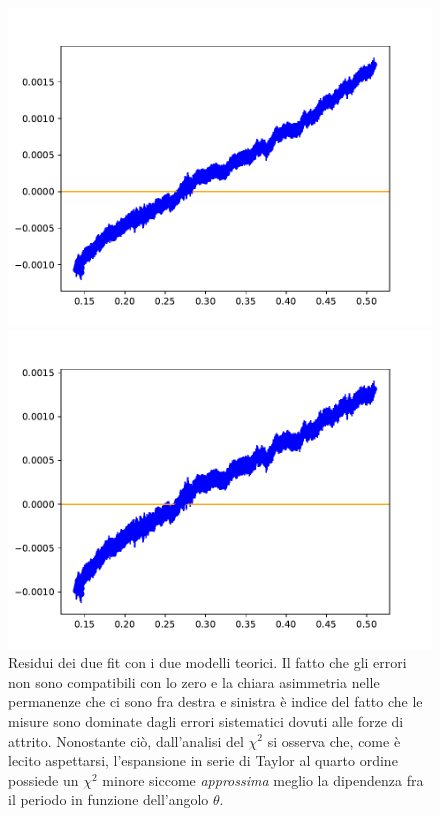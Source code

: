 \documentclass{article}
\begin{document}
\begin{figure}[H]
\hspace{-0.025\textwidth}
\begin{minipage}{0.49\textwidth}
	\centering
	\includegraphics[scale=0.60]{Residui_taylor_2.pdf}
\end{minipage}
\hspace{0.005\textwidth}
\begin{minipage}{0.49\textwidth}
	\centering
	\includegraphics[scale=0.60]{Residui_taylor_4.pdf}
\end{minipage}	
	\caption{Residui dei due fit con i due modelli teorici. Il fatto che gli errori non sono compatibili con lo zero e la chiara asimmetria nelle permanenze che ci sono fra destra e sinistra è indice del fatto che le misure sono dominate dagli errori sistematici dovuti alle forze di attrito. Nonostante ciò, dall'analisi del $\chi^2$ si osserva che, come è lecito aspettarsi, l'espansione in serie di Taylor al quarto ordine possiede un $\chi^2$ minore siccome \emph{approssima} meglio la dipendenza fra il periodo in funzione dell'angolo $\theta$.}
\end{figure}
\end{document}
